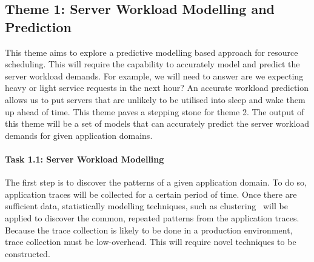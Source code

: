 \subsection{Theme 1: Server Workload Modelling and Prediction}
This theme aims to explore a predictive modelling based approach for resource scheduling. This will require the capability to accurately model and predict the server workload demands. For example, we will need to answer are we expecting heavy or light service requests in the next hour? An accurate workload prediction allows us to put servers that are unlikely to be utilised into sleep and wake them up ahead of time. This theme paves a stepping stone for theme 2. The output of this theme will be a set of models that can accurately predict the server workload demands for given application domains.
%



\paragraph{Task 1.1: Server Workload Modelling} The first step is to discover the patterns of a given application domain. To do so, 
application traces will be collected for a certain period of time. Once there are sufficient data, statistically modelling techniques, 
such as clustering~\cite{} will be applied to discover the common, repeated patterns from the application traces. Because the trace 
collection is likely to be done in a production environment, trace collection must be low-overhead. This will require novel techniques to be constructed.


